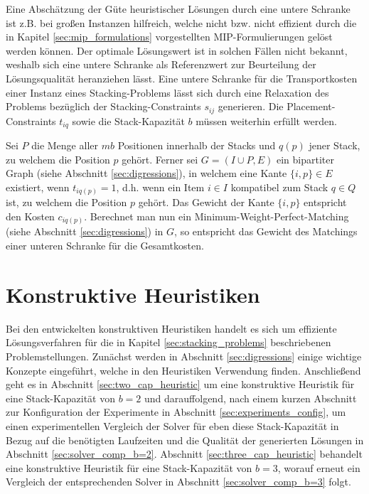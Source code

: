 Eine Abschätzung der Güte heuristischer Lösungen durch eine untere Schranke ist z.B. bei großen Instanzen hilfreich,
welche nicht bzw. nicht effizient durch die in Kapitel \ref{sec:mip_formulations} vorgestellten MIP-Formulierungen gelöst werden können.
Der optimale Lösungswert ist in solchen Fällen nicht bekannt, weshalb sich eine untere Schranke als Referenzwert
zur Beurteilung der Lösungsqualität heranziehen lässt. Eine untere Schranke für die Transportkosten einer Instanz eines Stacking-Problems lässt sich durch eine Relaxation des Problems bezüglich der Stacking-Constraints $s_{ij}$ generieren.
Die Placement-Constraints $t_{iq}$ sowie die Stack-Kapazität $b$ müssen weiterhin erfüllt werden.

Sei $P$ die Menge aller $mb$ Positionen innerhalb der Stacks und $q(p)$ jener Stack, zu welchem die Position $p$ gehört.
Ferner sei $G = (I \cup P, E)$ ein bipartiter Graph (siehe Abschnitt \ref{sec:digressions}), in welchem eine Kante $\{i, p\} \in E$ existiert, wenn $t_{iq(p)} = 1$, d.h. wenn ein Item $i \in I$ kompatibel zum Stack $q \in Q$ ist, zu welchem die Position $p$ gehört. Das Gewicht der Kante $\{i, p\}$ entspricht den Kosten $c_{iq(p)}$. Berechnet man nun ein
Minimum-Weight-Perfect-Matching (siehe Abschnitt \ref{sec:digressions}) in $G$, so entspricht das Gewicht des Matchings einer unteren Schranke für die Gesamtkosten.

\section{Konstruktive Heuristiken}
\label{sec:constructive_heuristics}

Bei den entwickelten konstruktiven Heuristiken handelt es sich um effiziente Lösungsverfahren für die in Kapitel \ref{sec:stacking_problems} beschriebenen Problemstellungen. Zunächst werden in Abschnitt \ref{sec:digressions} einige wichtige Konzepte eingeführt, welche in den Heuristiken Verwendung finden.
Anschließend geht es in Abschnitt \ref{sec:two_cap_heuristic} um eine konstruktive Heuristik für eine Stack-Kapazität
von $b = 2$ und darauffolgend, nach einem kurzen Abschnitt zur Konfiguration der Experimente in Abschnitt \ref{sec:experiments_config}, um einen experimentellen Vergleich der Solver für eben diese Stack-Kapazität in Bezug
auf die benötigten Laufzeiten und die Qualität der generierten Lösungen in Abschnitt \ref{sec:solver_comp_b=2}.
Abschnitt \ref{sec:three_cap_heuristic} behandelt eine konstruktive Heuristik für eine Stack-Kapazität von $b=3$, worauf erneut ein Vergleich der entsprechenden Solver in Abschnitt \ref{sec:solver_comp_b=3} folgt.


